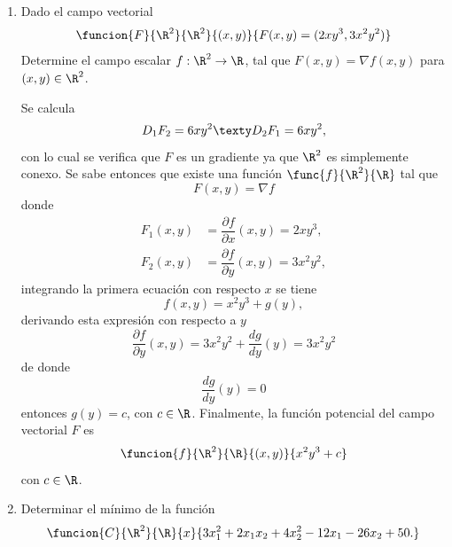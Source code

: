 \documentclass[a4,11pt]{aleph-examen}
\begin{document}
\begin{preguntas}
\begin{respuesta}
\begin{respuesta}
\begin{respuesta}
\begin{enumerate}
\item
    Dado el campo vectorial
    \[
        \funcion{F}{\R^2}{\R^2}{(x,y)}{F(x,y)=(2xy^3,3x^2 y^2)}
    \]
    Determine el campo escalar $f:\R^2\rightarrow \R$, tal que $F(x,y)=\nabla f(x,y)$ para $(x,y)\in\R^2$.
    
\begin{respuesta}
    Se calcula
    \[
        D_1F_2=6xy^2 \texty D_2F_1=6xy^2,
    \]
    con lo cual se verifica que $F$ es un gradiente ya que $\R^2$ es simplemente conexo. Se sabe entonces que existe una función $\func{f}{\R^2}{\R}$ tal que \[
        F(x,y)=\nabla f
    \]
    donde
    \begin{align*}
         F_1(x,y)&=\dfrac{\partial f}{\partial x}(x,y)=2xy^3,\\
         F_2(x,y)&=\dfrac{\partial f}{\partial y}(x,y)=3x^2y^2,
    \end{align*}
    integrando la primera ecuación con respecto $x$ se tiene
    \[
        f(x,y)=x^2y^3+g(y),
    \]
    derivando esta expresión con respecto a $y$
    \[
        \dfrac{\partial f}{\partial y}(x,y)=3x^2y^2+\dfrac{dg}{dy}(y)=3x^2y^2
    \]
    de donde 
    \[
        \dfrac{dg}{dy}(y)=0
    \]
    entonces $g(y)=c$, con $c\in\R$.
    Finalmente, la función potencial del campo vectorial $F$ es
    \[
        \funcion{f}{\R^2}{\R}{(x,y)}{x^2y^3+c}
    \]
    con $c\in\R$.
\end{respuesta}
        

\item 
	Determinar el mínimo de la función
	\[
	    \funcion{C}{\R^2}{\R}{x}
	    {3x_1^2+2x_1x_2+4x_2^2-12x_1-26x_2+50.}
	\]


\end{enumerate}
\end{respuesta}
\end{respuesta}
\end{respuesta}
\end{preguntas}
\end{document}

